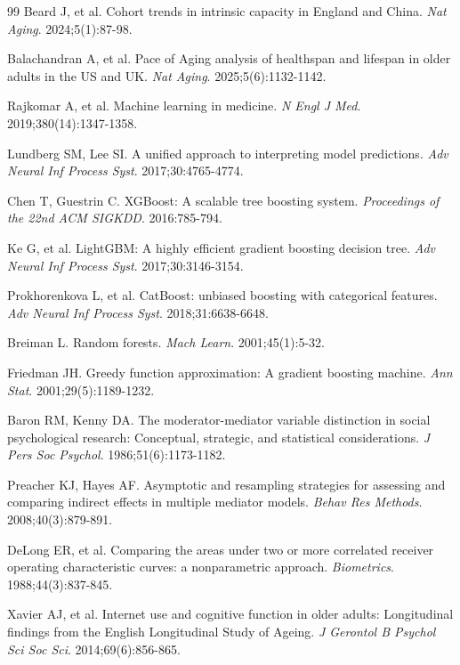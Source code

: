 \documentclass[10pt]{article}
\begin{document}
\begin{thebibliography}{99}
Beard J, et al. Cohort trends in intrinsic capacity in England and China. \textit{Nat Aging}. 2024;5(1):87-98.

Balachandran A, et al. Pace of Aging analysis of healthspan and lifespan in older adults in the US and UK. \textit{Nat Aging}. 2025;5(6):1132-1142.

Rajkomar A, et al. Machine learning in medicine. \textit{N Engl J Med}. 2019;380(14):1347-1358.

Lundberg SM, Lee SI. A unified approach to interpreting model predictions. \textit{Adv Neural Inf Process Syst}. 2017;30:4765-4774.

Chen T, Guestrin C. XGBoost: A scalable tree boosting system. \textit{Proceedings of the 22nd ACM SIGKDD}. 2016:785-794.

Ke G, et al. LightGBM: A highly efficient gradient boosting decision tree. \textit{Adv Neural Inf Process Syst}. 2017;30:3146-3154.

Prokhorenkova L, et al. CatBoost: unbiased boosting with categorical features. \textit{Adv Neural Inf Process Syst}. 2018;31:6638-6648.

Breiman L. Random forests. \textit{Mach Learn}. 2001;45(1):5-32.

Friedman JH. Greedy function approximation: A gradient boosting machine. \textit{Ann Stat}. 2001;29(5):1189-1232.

Baron RM, Kenny DA. The moderator-mediator variable distinction in social psychological research: Conceptual, strategic, and statistical considerations. \textit{J Pers Soc Psychol}. 1986;51(6):1173-1182.

Preacher KJ, Hayes AF. Asymptotic and resampling strategies for assessing and comparing indirect effects in multiple mediator models. \textit{Behav Res Methods}. 2008;40(3):879-891.

DeLong ER, et al. Comparing the areas under two or more correlated receiver operating characteristic curves: a nonparametric approach. \textit{Biometrics}. 1988;44(3):837-845.

Xavier AJ, et al. Internet use and cognitive function in older adults: Longitudinal findings from the English Longitudinal Study of Ageing. \textit{J Gerontol B Psychol Sci Soc Sci}. 2014;69(6):856-865.


\end{thebibliography}
\end{document}
